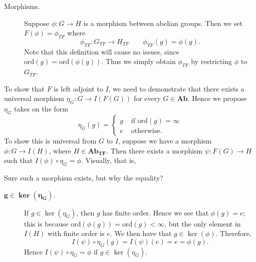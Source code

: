 \begin{example}
\begin{description}
            \item[Morphisms.] Suppose $\phi: G \to H$ is a morphism
            between abelian groups. Then we set $F(\phi) = \phi_{TF}$
            where 
            \[
                \phi_{TF}: G_{TF} \to H_{TF} \qquad \phi_{TF}(g) = \phi(g).
            \]
            Note that this definition will cause no issues, since
            $\text{ord}(g) = \text{ord}(\phi(g))$. Thus we simply
            obtain $\phi_{TF}$ by restricting $\phi$ to $G_{TF}$.
        \end{description} 
        To show that $F$ is left adjoint to $I$, we need to
        demonstrate that there exists a universal morphism $\eta_{G} :
        G \to I(F(G))$ for every $G \in \textbf{Ab}$. Hence we propose
        $\eta_{G}$ takes on the form 
        \[
            \eta_{G}(g) = 
            \begin{cases}
                g & \text{ if } \text{ord}(g) = \infty\\
                e & \text{ otherwise. }
            \end{cases}
        \]
        To show this is universal from $G$ to $I$, suppose we have a
        morphism $\phi: G \to I(H)$, where $H \in
        \textbf{Ab}_{\textbf{TF}}$. Then there exists a morphism
        $\psi: F(G) \to H$ such that $I(\phi) \circ \eta_{G} = \phi$.
        Visually, that is, 
        \begin{center}
            \hspace{1cm}
        \end{center}
        Sure such a morphism exists, but why the equality? 
        \begin{description}
            \item[$\bm{g \in \ker(\eta_G)}$.] If $g \in \ker(\eta_G)$,
            then $g$ has finite order. Hence we see that $\phi(g) =
            e$; this is because $\text{ord}(\phi(g)) =
            \text{ord}(g) < \infty$, but the only element in $I(H)$
            with finite order is $e$. We then have that $g \in
            \ker(\phi)$. Therefore, 
            \[
                I(\psi)\circ \eta_G(g) = I(\psi)(e) = e = \phi(g).
            \]
            Hence $I(\psi) \circ \eta_G = \phi$ if $g \in
            \ker(\eta_{G})$. 


\end{description}
\end{example}

